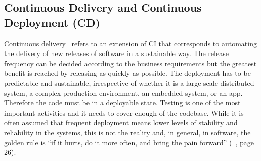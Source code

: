 \documentclass[a4paper]{spie}  %
\begin{document}
\subsection{Continuous Delivery and Continuous Deployment (CD)}
Continuous delivery~\cite{CD} refers to an extension of CI that corresponds to automating the delivery of new releases of software in a sustainable way. The release frequency can be decided according to the business requirements but the greatest benefit is reached by releasing as quickly as possible.
The deployment has to be predictable and sustainable, irrespective of whether it is a large-scale distributed system, a complex production environment, an embedded system, or an app. Therefore the code must be in a deployable state. Testing is one of the most important activities and it needs to cover enough of the codebase.
While it is often assumed that frequent deployment means lower levels of stability and reliability in the systems, this is not the reality and, in general, in software, the golden rule is “if it hurts, do it more often, and bring the pain forward” (~\cite{CD}, page 26).
\end{document}
